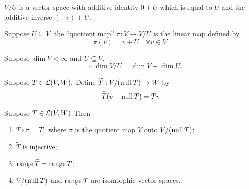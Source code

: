 \begin{thm} 
  $V/U$ is a vector space with additive identity $0+U$ which is equal to $U$ and the additive inverse $(-v)+U$.
\end{thm}

\begin{mydef} 
  Suppose $U \subseteq V$. the ``quotient map'' $\pi: V \to V/U$ is the linear map defined by
  \begin{equation}
    \pi(v)=v+U \quad \forall v \in V.
  \end{equation}
\end{mydef}

\begin{thm}
  Suppose $\dim V < \infty$ and $U \subseteq V$.
  \begin{equation}
    \implies \dim V/U = \dim V - \dim U.
  \end{equation}
\end{thm}

\begin{mydef} 
  Suppose $T \in \mathcal{L}(V,W).$ Define $\widetilde{T}: V/(\operatorname{null} T) \to W$ by
  \begin{equation}
    \widetilde{T}(v+\operatorname{null} T) = Tv
  \end{equation}
\end{mydef}

\begin{thm}
  Suppose $T\in \mathcal{L}(V,W)$ Then
  \begin{enumerate}
    \item $\widetilde{T} \circ \pi = T,$ where $\pi$ is the quotient map $V$ onto $V/(\operatorname{null} T)$;
    \item $\widetilde{T}$ is injective;
    \item $\operatorname{range} \widetilde{T} = \operatorname{range} T$;
    \item $V/(\operatorname{null} T)$ and $\operatorname{range} T$ are isomorphic vector spaces.
  \end{enumerate}
\end{thm}